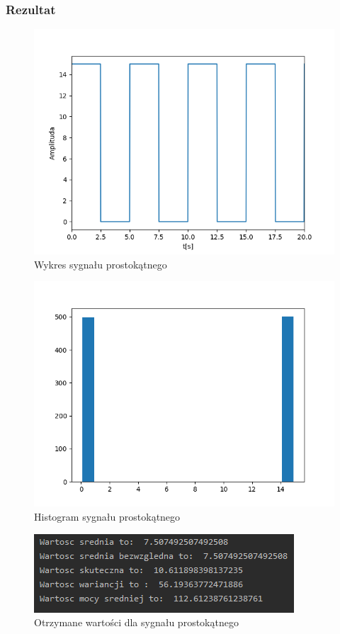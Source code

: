 \documentclass[12pt]{article}
\begin{document}
\subsubsection{Rezultat}
\begin{figure}[H]
\centering
\includegraphics[scale=0.8]{sygProstWykres.png}
\caption{Wykres sygnału prostokątnego}
\end{figure}
\begin{figure}[H]
\centering
\includegraphics[scale=0.8]{sygProstHist.png}
\caption{Histogram sygnału prostokątnego}
\end{figure}
\begin{figure}[H]
\centering
\includegraphics[scale=0.8]{sygProstParam.png}
\caption{Otrzymane wartości dla sygnału prostokątnego}
\end{figure}
\end{document}
